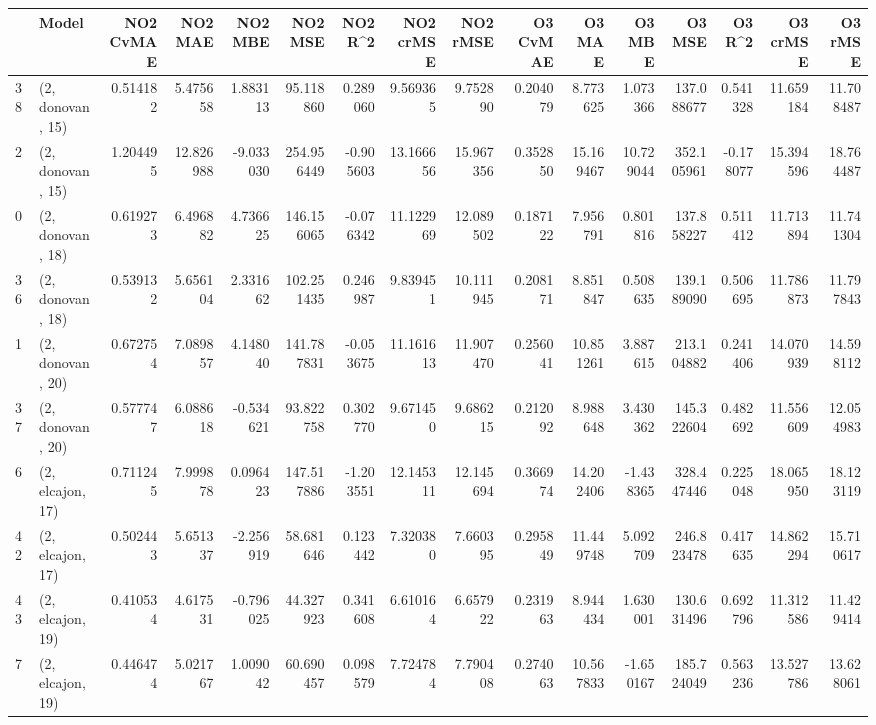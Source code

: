 \begin{tabular}{llrrrrrrrrrrrrrr}
\toprule
{} &             Model &  NO2 CvMAE &    NO2 MAE &   NO2 MBE &     NO2 MSE &   NO2 R\textasciicircum2 &  NO2 crMSE &   NO2 rMSE &  O3 CvMAE &     O3 MAE &     O3 MBE &      O3 MSE &    O3 R\textasciicircum2 &   O3 crMSE &    O3 rMSE \\
\midrule
38 &  (2, donovan, 15) &   0.514182 &   5.475658 &  1.883113 &   95.118860 &  0.289060 &   9.569365 &   9.752890 &  0.204079 &   8.773625 &   1.073366 &  137.088677 &  0.541328 &  11.659184 &  11.708487 \\
2  &  (2, donovan, 15) &   1.204495 &  12.826988 & -9.033030 &  254.956449 & -0.905603 &  13.166656 &  15.967356 &  0.352850 &  15.169467 &  10.729044 &  352.105961 & -0.178077 &  15.394596 &  18.764487 \\
0  &  (2, donovan, 18) &   0.619273 &   6.496882 &  4.736625 &  146.156065 & -0.076342 &  11.122969 &  12.089502 &  0.187122 &   7.956791 &   0.801816 &  137.858227 &  0.511412 &  11.713894 &  11.741304 \\
36 &  (2, donovan, 18) &   0.539132 &   5.656104 &  2.331662 &  102.251435 &  0.246987 &   9.839451 &  10.111945 &  0.208171 &   8.851847 &   0.508635 &  139.189090 &  0.506695 &  11.786873 &  11.797843 \\
1  &  (2, donovan, 20) &   0.672754 &   7.089857 &  4.148040 &  141.787831 & -0.053675 &  11.161613 &  11.907470 &  0.256041 &  10.851261 &   3.887615 &  213.104882 &  0.241406 &  14.070939 &  14.598112 \\
37 &  (2, donovan, 20) &   0.577747 &   6.088618 & -0.534621 &   93.822758 &  0.302770 &   9.671450 &   9.686215 &  0.212092 &   8.988648 &   3.430362 &  145.322604 &  0.482692 &  11.556609 &  12.054983 \\
6  &  (2, elcajon, 17) &   0.711245 &   7.999878 &  0.096423 &  147.517886 & -1.203551 &  12.145311 &  12.145694 &  0.366974 &  14.202406 &  -1.438365 &  328.447446 &  0.225048 &  18.065950 &  18.123119 \\
42 &  (2, elcajon, 17) &   0.502443 &   5.651337 & -2.256919 &   58.681646 &  0.123442 &   7.320380 &   7.660395 &  0.295849 &  11.449748 &   5.092709 &  246.823478 &  0.417635 &  14.862294 &  15.710617 \\
43 &  (2, elcajon, 19) &   0.410534 &   4.617531 & -0.796025 &   44.327923 &  0.341608 &   6.610164 &   6.657922 &  0.231963 &   8.944434 &   1.630001 &  130.631496 &  0.692796 &  11.312586 &  11.429414 \\
7  &  (2, elcajon, 19) &   0.446474 &   5.021767 &  1.009042 &   60.690457 &  0.098579 &   7.724784 &   7.790408 &  0.274063 &  10.567833 &  -1.650167 &  185.724049 &  0.563236 &  13.527786 &  13.628061 \\

\end{tabular}
